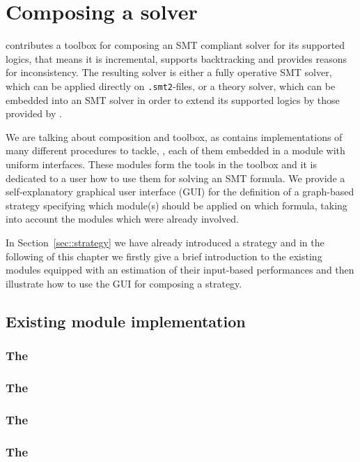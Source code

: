 \chapter{Composing a solver}
\label{chapter:composingats}
\smtrat contributes a toolbox for composing an SMT compliant solver for its supported logics, that means it is incremental, supports backtracking and provides reasons for inconsistency. The resulting
solver is either a fully operative SMT solver, which can be applied
directly on \texttt{.smt2}-files, or a theory solver, which can be embedded into an SMT 
solver in order to extend its supported logics by those provided by \smtrat.

We are talking about composition and toolbox, as \smtrat contains implementations
of many different procedures to tackle, \eg \supportedLogics, each of them
embedded in a module with uniform interfaces. These modules form the tools in the toolbox
and it is dedicated to a user how to use them for solving an SMT formula.
We provide a self-explanatory graphical user interface (GUI) for the definition of a graph-based 
strategy specifying which module(s) should be applied on which formula, 
taking into account the modules which were already involved.

In Section~\ref{sec::strategy} we have already introduced
a strategy and in the following of this chapter we firstly give a brief introduction 
to the existing modules equipped with an estimation of their input-based performances and then illustrate
how to use the GUI for composing a strategy.

\section{Existing module implementation}
\subsection{The \cnferModuleClass}

\subsection{The \satModuleClass}

\subsection{The \lraModuleClass}

\subsection{The \gbModuleClass}

